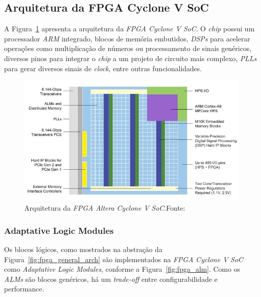    \subsection{Arquitetura da FPGA Cyclone V SoC}
    { A Figura~\ref{fig:cyclone_v_arch} apresenta a arquitetura da
        \textit{FPGA Cyclone V SoC}. O \textit{chip} possui um processador
        \textit{ARM} integrado, blocos de memória embutidos, \textit{DSPs} para
        acelerar operações como multiplicação de números ou processamento de
        sinais genéricos, diversos pinos para integrar o \textit{chip} a
        um projeto de circuito mais complexo, \textit{PLLs} para gerar diversos
        sinais de \textit{clock}, entre outras funcionalidades.
    }

    \begin{figure}[H]
    \centering
    \includegraphics[width=1\linewidth]
        {../images/altera_cyclone_v_soc_architectural_downscale.jpg}
        \caption[Arquitetura da FPGA Intel Cyclone V SoC]
            {Arquitetura da \textit{FPGA Altera Cyclone V SoC}.\quad Fonte:~\cite{cyclone_v_soc}}
        \label{fig:cyclone_v_arch}
    \end{figure}

        \subsubsection{Adaptative Logic Modules}
        { Os blocos lógicos, como mostrados na abstração da Figura~\ref{fig:fpga_general_arch}
            são implementados na \textit{FPGA Cyclone V SoC} como
            \textit{Adaptative Logic Modules}, conforme a Figura~\ref{fig:fpga_alm}.
            Como os \textit{ALMs} são blocos genéricos, há um \textit{trade-off}
            entre configurabilidade e performance.
        }

